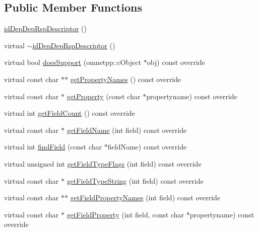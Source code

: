 \subsection*{Public Member Functions}
\begin{DoxyCompactItemize}
\item 
\hyperlink{classid_dep_dep_rsp_descriptor_a3e2274676a0c9a331848c609c9896ecf}{id\+Dep\+Dep\+Rsp\+Descriptor} ()
\item 
virtual \hyperlink{classid_dep_dep_rsp_descriptor_a35bc747b5221c962f04af7f5370f7f4b}{$\sim$id\+Dep\+Dep\+Rsp\+Descriptor} ()
\item 
virtual bool \hyperlink{classid_dep_dep_rsp_descriptor_a67b0832686fbd38cfb80742967116e83}{does\+Support} (omnetpp\+::c\+Object $\ast$obj) const override
\item 
virtual const char $\ast$$\ast$ \hyperlink{classid_dep_dep_rsp_descriptor_a1d0ba88794577cd83f8d752bbf61845b}{get\+Property\+Names} () const override
\item 
virtual const char $\ast$ \hyperlink{classid_dep_dep_rsp_descriptor_ad149f4ccae414eb97ce9959fe4b852c7}{get\+Property} (const char $\ast$propertyname) const override
\item 
virtual int \hyperlink{classid_dep_dep_rsp_descriptor_a7dcb46ff173cfd041ed0299eeef3e09d}{get\+Field\+Count} () const override
\item 
virtual const char $\ast$ \hyperlink{classid_dep_dep_rsp_descriptor_a74aea0c9020a73de0a76814586b94406}{get\+Field\+Name} (int field) const override
\item 
virtual int \hyperlink{classid_dep_dep_rsp_descriptor_ae74524f33495bc3f07c716c8f8ca2d1f}{find\+Field} (const char $\ast$field\+Name) const override
\item 
virtual unsigned int \hyperlink{classid_dep_dep_rsp_descriptor_a93352aea8757f59f6ae4f349733a4dea}{get\+Field\+Type\+Flags} (int field) const override
\item 
virtual const char $\ast$ \hyperlink{classid_dep_dep_rsp_descriptor_af3d0017c6dfbd3fceb127ea34563d7fe}{get\+Field\+Type\+String} (int field) const override
\item 
virtual const char $\ast$$\ast$ \hyperlink{classid_dep_dep_rsp_descriptor_aa14ccdc15e3d4c79f0ae6517d1222e8f}{get\+Field\+Property\+Names} (int field) const override
\item 
virtual const char $\ast$ \hyperlink{classid_dep_dep_rsp_descriptor_a177024add048c4071ea703c072a2733c}{get\+Field\+Property} (int field, const char $\ast$propertyname) const override

\end{DoxyCompactItemize}
